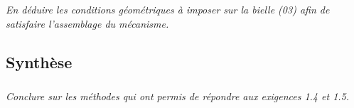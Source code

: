 \begin{multicols}{2}
\subparagraph{}
\textit{En déduire les conditions géométriques à imposer sur la bielle (03) afin de satisfaire l’assemblage du mécanisme. }
\ifprof
\begin{corrige}
\end{corrige}\else\fi



\subsection*{Synthèse}
\subparagraph{}
\textit{Conclure sur les méthodes qui ont permis de répondre aux exigences 1.4 et 1.5.}
\ifprof
\begin{corrige}
\end{corrige}\else\fi
\end{multicols}

